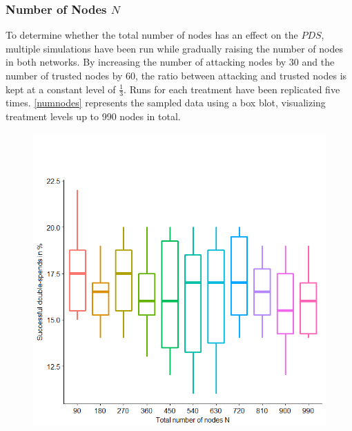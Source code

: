 \documentclass[a4paper,12pt,twoside]{report}
\begin{document}
\subsubsection{Number of Nodes $N$}
To determine whether the total number of nodes has an effect on the $PDS$, multiple simulations have been run while gradually raising the number of nodes in both networks. By increasing the number of attacking nodes by 30 and the number of trusted nodes by 60, the ratio between attacking and trusted nodes is kept at a constant level of $\frac{1}{3}$. Runs for each treatment have been replicated five times.  \autoref{numnodes} represents the sampled data using a box blot, visualizing treatment levels up to 990 nodes in total.
\begin{figure}
\centering
\begin{minipage}{.5\textwidth}
  \centering
  \includegraphics[width=\linewidth]{Experiments/numnodes.png}
  \label{numnodes}
\end{minipage}%
\begin{minipage}{.5\textwidth}
  \centering

\end{minipage}
\end{figure}
\end{document}
